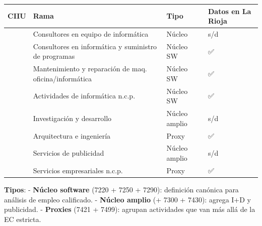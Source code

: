 \documentclass[
  spanish,
  letterpaper,
  DIV=11,
  numbers=noendperiod]{scrartcl}
\newcounter{none} %
\begin{document}
{\def\LTcaptype{none} %
\begin{longtable}[]{@{}
  >{\centering\arraybackslash}p{}
  >{\raggedright\arraybackslash}p{}
  >{\raggedright\arraybackslash}p{}
  >{\centering\arraybackslash}p{}@{}}
\toprule\noalign{}
\begin{minipage}[b]{\linewidth}\centering
CIIU
\end{minipage} & \begin{minipage}[b]{\linewidth}\raggedright
Rama
\end{minipage} & \begin{minipage}[b]{\linewidth}\raggedright
Tipo
\end{minipage} & \begin{minipage}[b]{\linewidth}\centering
Datos en La Rioja
\end{minipage} \\
\midrule\noalign{}
\endhead
\bottomrule\noalign{}
\endlastfoot
7210 & Consultores en equipo de informática & Núcleo & s/d \\
7220 & Consultores en informática y suministro de programas & Núcleo SW
& ✅ \\
7250 & Mantenimiento y reparación de maq. oficina/informática & Núcleo
SW & ✅ \\
7290 & Actividades de informática n.c.p. & Núcleo SW & ✅ \\
7300 & Investigación y desarrollo & Núcleo amplio & s/d \\
7421 & Arquitectura e ingeniería & Proxy & ✅ \\
7430 & Servicios de publicidad & Núcleo amplio & s/d \\
7499 & Servicios empresariales n.c.p. & Proxy & ✅ \\
\end{longtable}
}

\textbf{Tipos}: - \textbf{Núcleo software} (7220 + 7250 + 7290):
definición canónica para análisis de empleo calificado. - \textbf{Núcleo
amplio} (+ 7300 + 7430): agrega I+D y publicidad. - \textbf{Proxies}
(7421 + 7499): agrupan actividades que van más allá de la EC estricta.
\end{document}
